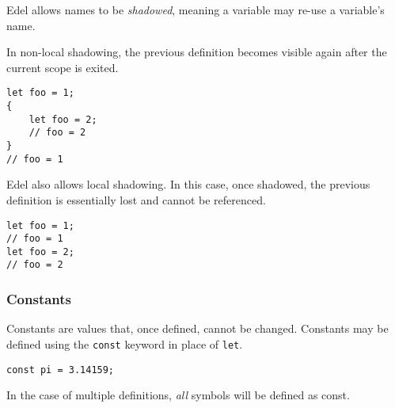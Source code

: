 Edel allows names to be \textit{shadowed}, meaning a variable may re-use a variable's name.

In non-local shadowing, the previous definition becomes visible again after the current scope is exited.
\begin{lstlisting}[language=CustomLang]
let foo = 1;
{
    let foo = 2;
    // foo = 2
}
// foo = 1
\end{lstlisting}

Edel also allows local shadowing.
In this case, once shadowed, the previous definition is essentially lost and cannot be referenced.
\begin{lstlisting}[language=CustomLang]
let foo = 1;
// foo = 1
let foo = 2;
// foo = 2
\end{lstlisting}

\subsubsection{Constants}

Constants are values that, once defined, cannot be changed.
Constants may be defined using the \texttt{const} keyword in place of \texttt{let}.

\begin{lstlisting}[language=CustomLang]
const pi = 3.14159;
\end{lstlisting}

In the case of multiple definitions, \textit{all} symbols will be defined as const.
